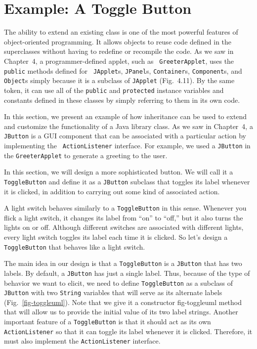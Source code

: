 \section{Example: A Toggle Button}
\label{sec-toggle}
\label{pg-sec-toggle}

\noindent The ability to extend an existing class is one of the most
 powerful features of object-oriented
programming.  It allows objects to reuse code defined in the
superclasses without having to redefine or recompile the code.  As we
saw in Chapter~4, a programmer-defined applet, such as {\tt
GreeterApplet}, uses the {\tt public} methods defined for {\tt
JApplet}s, {\tt JPanel}s, {\tt Container}s, {\tt Component}s, and {\tt
Object}s simply because it is a subclass of {\tt JApplet}
(Fig.~4.11).  By the same token, it can use all of the {\tt public}
and {\tt protected} instance variables and constants defined in these
classes by simply referring to them in its own code.

In this section, we present an example of how inheritance can be used
to extend and customize the functionality of a Java library class. As
we saw in Chapter~4, a {\tt JButton} is a GUI component that can be
associated with a particular action by implementing the {\tt
ActionListener} interface.  For example, we used a {\tt JButton} in
the {\tt GreeterApplet} to generate a greeting to the user.

In this section, we will design a more sophisticated button. 
We will call it a  {\tt ToggleButton} and define it as a {\tt JButton} subclass that
toggles its label whenever it is clicked, in addition to
carrying out some kind of associated action.

A light switch behaves similarly to a {\tt ToggleButton} in this
sense.  Whenever you flick a light switch, it changes its label from
``on'' to ``off,'' but it also turns the lights on or off.  Although
different switches are associated with different lights, every light
switch toggles its label each time it is clicked.  So let's design a
{\tt ToggleButton} that behaves like a light switch.

The main idea in our design is that a {\tt ToggleButton} is a
{\tt JButton} that has two labels. By default, a {\tt JButton} has just
a single label. Thus, because of the type of behavior we want to elicit,
we need to define {\tt ToggleButton} as a subclass of
{\tt JButton} with two {\tt String} variables that will serve as its
alternate labels (Fig.~\ref{fig-toggleuml}). Note that we give it a constructor
{fig-toggleuml}
method that will allow us to provide the initial value of its two
label strings. Another important feature of a {\tt ToggleButton} is
that it should act as its own {\tt ActionListener} so that it can
toggle its label whenever it is clicked. Therefore, it must also
implement the {\tt ActionListener} interface.  


